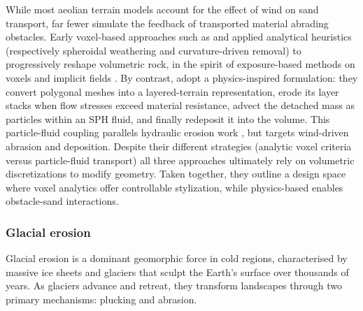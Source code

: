 While most aeolian terrain models account for the effect of wind on sand transport, far fewer simulate the feedback of transported material abrading obstacles. Early voxel-based approaches such as \cite{Beardall2007} and \cite{Jones2010} applied analytical heuristics (respectively spheroidal weathering and curvature-driven removal) to progressively reshape volumetric rock, in the spirit of exposure-based methods on voxels and implicit fields \cite{Paris2019a}. By contrast, \cite{Krs2020} adopt a physics-inspired formulation: they convert polygonal meshes into a layered-terrain representation, erode its layer stacks when flow stresses exceed material resistance, advect the detached mass as particles within an SPH fluid, and finally redeposit it into the volume. This particle-fluid coupling parallels hydraulic erosion work \cite{Kristof2009}, but targets wind-driven abrasion and deposition. Despite their different strategies (analytic voxel criteria versus particle-fluid transport) all three approaches ultimately rely on volumetric discretizations to modify geometry. Taken together, they outline a design space where voxel analytics offer controllable stylization, while physics-based enables obstacle-sand interactions. %




\subsubsection{Glacial erosion}
Glacial erosion is a dominant geomorphic force in cold regions, characterised by massive ice sheets and glaciers that sculpt the Earth's surface over thousands of years. As glaciers advance and retreat, they transform landscapes through two primary mechanisms: plucking and abrasion.

